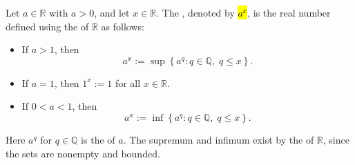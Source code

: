 \begin{definition} \label{definition:real_exponentiation_via_supremum}
    Let $a \in \mathbb{R}$ with $a > 0$, and let $x \in \mathbb{R}$. The , denoted by \hl{$a^x$}, is the real number defined using the  of $\mathbb{R}$ as follows:
    \begin{itemize}
        \item If $a > 1$, then
            $$a^x := \sup\left\{ a^q : q \in \mathbb{Q},\; q \leq x \right\}.$$
        \item If $a = 1$, then $1^x := 1$ for all $x \in \mathbb{R}$.
        \item If $0 < a < 1$, then
            $$a^x := \inf\left\{ a^q : q \in \mathbb{Q},\; q \leq x \right\}.$$
    \end{itemize}
    Here $a^q$ for $q \in \mathbb{Q}$ is the  of $a$. The supremum and infimum exist by the  of $\mathbb{R}$, since the sets are nonempty and bounded.
\end{definition}
